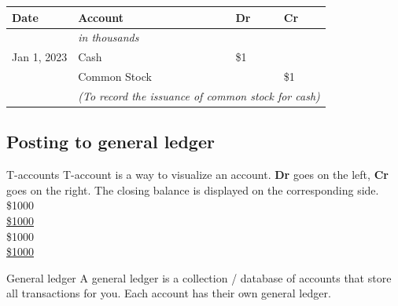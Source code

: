 \small
\begin{tcolorbox}[colframe=black,colback=white,title=Example Journal Entry]
    \begin{tabular}{llll}
        \textbf{Date} & \textbf{Account}                                                               & \textbf{Dr} & \textbf{Cr} \\
        \hline
                      & \textit{in thousands}                                                          &             &             \\
        Jan 1, 2023   & Cash                                                                           & \$1         &             \\
                      & \quad Common Stock                                                             &             & \$1         \\
                      & \multicolumn{3}{l}{\textit{(To record the issuance of common stock for cash)}}                             \\
    \end{tabular}
\end{tcolorbox}
\normalsize

\subsection{Posting to general ledger}
\label{subsec:post}

\begin{knBox}
    {T-accounts}
    T-account is a way to visualize an account. \textbf{Dr} goes on the left, \textbf{Cr} goes on the right. The closing balance is displayed on the corresponding side.
    \tcblower
    {\$1000\\\hline\underline{\underline{\$1000}}}
    {}
    {\\}
    {\$1000\\\hline\underline{\underline{\$1000}}}
\end{knBox}

\begin{definition}
    {General ledger}
    A general ledger is a collection / database of accounts that store all transactions for you. Each account has their own general ledger.
    \label{def:gl}
\end{definition}

